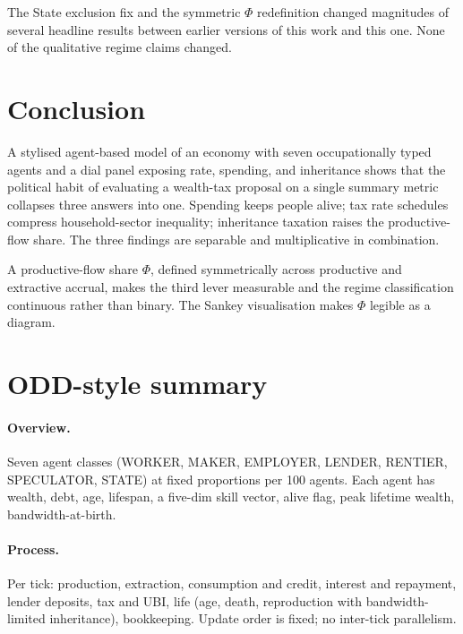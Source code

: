 \documentclass[11pt]{article}
\begin{document}
The State exclusion fix and the symmetric $\Phi$ redefinition
changed magnitudes of several headline results between earlier
versions of this work and this one.  None of the qualitative
regime claims changed.

\section{Conclusion}

A stylised agent-based model of an economy with seven occupationally
typed agents and a dial panel exposing rate, spending, and
inheritance shows that the political habit of evaluating a wealth-tax
proposal on a single summary metric collapses three answers into
one.  Spending keeps people alive; tax rate schedules compress
household-sector inequality; inheritance taxation raises the
productive-flow share.  The three findings are separable and
multiplicative in combination.

A productive-flow share $\Phi$, defined symmetrically across
productive and extractive accrual, makes the third lever
measurable and the regime classification continuous rather than
binary.  The Sankey visualisation makes $\Phi$ legible as a
diagram.




\appendix
\section{ODD-style summary}
\label{app:odd}

\paragraph{Overview.} Seven agent classes (WORKER, MAKER, EMPLOYER,
LENDER, RENTIER, SPECULATOR, STATE) at fixed proportions per 100
agents.  Each agent has wealth, debt, age, lifespan, a five-dim
skill vector, alive flag, peak lifetime wealth, bandwidth-at-birth.

\paragraph{Process.} Per tick: production, extraction, consumption
and credit, interest and repayment, lender deposits, tax and UBI,
life (age, death, reproduction with bandwidth-limited inheritance),
bookkeeping.  Update order is fixed; no inter-tick parallelism.
\end{document}
